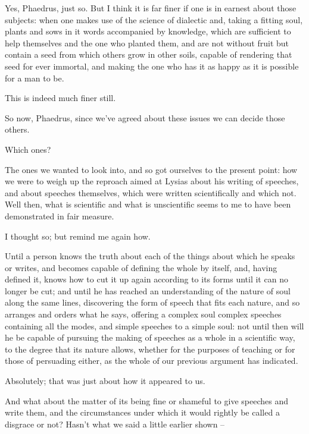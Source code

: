Yes, Phaedrus, just so. But I think it is far finer if one
 is in earnest about those subjects: when one makes use of the
science of dialectic and, taking a fitting soul, plants and sows in it
words accompanied by knowledge, which are sufficient to help themselves
and the one who planted them, and are not without  fruit but
contain a seed from which others grow in other soils, capable of
rendering that seed for ever immortal, and making the one who has it as
happy as it is possible for a man to be.

This is indeed much finer still. 

So now, Phaedrus, since we've agreed about these issues we can
decide those others.

Which ones?

The ones we wanted to look into, and so got ourselves to the
present point: how we were to weigh up the reproach aimed  at
Lysias about his writing of speeches, and about speeches themselves,
 which were written scientifically and which not. Well then,
what is scientific and what is unscientific seems to me to have been
demonstrated in fair measure.

I thought so; but remind me again how.

Until a person knows the truth about each of the 
things about which he speaks or writes, and becomes capable of defining
the whole by itself, and, having defined it, knows how to cut it up
again according to its forms until it can no longer be cut; and until he
has reached an understanding of the nature of soul along the same lines,
discovering the form of  speech that fits each nature, and so
arranges and orders what he says, offering a
complex soul complex
speeches containing all the modes, and simple speeches to a simple soul:
not until then will he be capable of pursuing the making of speeches as
a whole in a scientific way, to the degree that its nature allows,
 whether for the purposes of teaching or for those of persuading
either, as the whole of our previous argument has indicated.

Absolutely; that was just about how it appeared to us.

And what about the matter of its being fine or 
shameful to give speeches and write them, and the circumstances under
which it would rightly be called a disgrace or not? Hasn't what we said
a little earlier shown --

